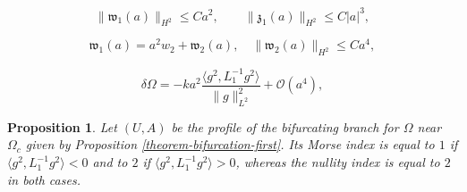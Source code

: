 \documentclass[10pt,a4paper]{amsart}
\newtheorem{proposition}{Proposition}
\begin{document}
\begin{equation}
    \label{bounds-on-terms}
\| \mathfrak{w}_1(a) \|_{H^2} \leq C a^2, \qquad \| \mathfrak{z}_1(a) \|_{H^2} \leq C |a|^3,
\end{equation}

\begin{equation}
    \label{near-identity}
\mathfrak{w}_1(a) = a^2 w_2 + \mathfrak{w}_2(a), \quad \| \mathfrak{w}_2(a) \|_{H^2} \leq C a^4, 
\end{equation}

\begin{equation}
    \label{delta-Omega}
\delta \Omega = - k a^2  \frac{\langle g^2, L_1^{-1} g^2 \rangle}{\| g \|^2_{L^2}} + \mathcal{O}(a^4),
\end{equation}

\begin{proposition}
    \label{theorem-Morse-first}
    Let $(U,A)$ be the profile of the bifurcating branch for $\Omega$ near $\Omega_c$ given by Proposition \ref{theorem-bifurcation-first}. 
Its Morse index is equal to $1$ if $\langle g^2, L_1^{-1} g^2 \rangle < 0$ and to $2$ if $\langle g^2, L_1^{-1} g^2 \rangle > 0$, 
    whereas the nullity index is equal to $2$ in both cases. 
\end{proposition}
\end{document}
